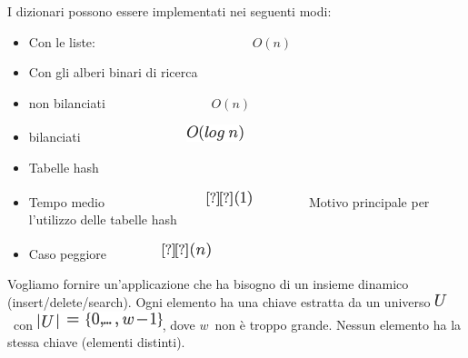 \documentclass{article}
\providecommand{\tightlist}{%
  \setlength{\itemsep}{0pt}\setlength{\parskip}{0pt}}
\begin{document}
{}

{I dizionari possono essere implementati nei seguenti modi:}

\begin{itemize}
\tightlist
\item
  {Con le liste:
  ~~~~~~~~~~~~~~~~~~~~~~~~}$O(n)$
\item
  {Con gli alberi binari di ricerca}
\end{itemize}

\begin{itemize}
\tightlist
\item
  {non bilanciati ~~~~~~~~~~~~~~~~}$O(n)$
\item
  {bilanciati ~~~~~~~~~~~~~~~~}\includegraphics{images/image220.png}
\end{itemize}

\begin{itemize}
\tightlist
\item
  {Tabelle hash}
\end{itemize}

\begin{itemize}
\tightlist
\item
  {Tempo
  medio~~~~~~~~~~~~~~~~}\includegraphics{images/image221.png}{~~~~~~~~~Motivo
  principale per l'utilizzo delle tabelle hash}
\item
  {Caso peggiore ~~~~~~~~}\includegraphics{images/image149.png}
\end{itemize}

{}

{Vogliamo fornire un'applicazione che ha bisogno di un insieme dinamico
(insert/delete/search). Ogni elemento ha una chiave estratta da un
universo }\includegraphics{images/image222.png}{~con
}\includegraphics{images/image223.png}{, dove
}$w${~non è troppo grande. Nessun
elemento ha la stessa chiave (elementi distinti). }

{}
\end{document}
